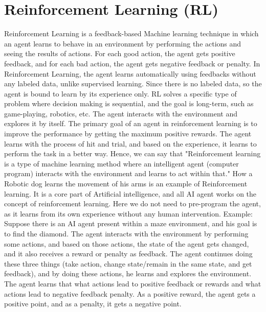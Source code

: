 \documentclass[12pt,a4paper]{report}
\begin{document}
\chapter{Reinforcement Learning (RL)}
\vspace{-1cm}
Reinforcement Learning is a feedback-based Machine learning technique in which an agent learns to behave in an environment by performing the actions and seeing the results of actions. For each good action, the agent gets positive feedback, and for each bad action, the agent gets negative feedback or penalty.
In Reinforcement Learning, the agent learns automatically using feedbacks without any labeled data, unlike supervised learning.
Since there is no labeled data, so the agent is bound to learn by its experience only.
RL solves a specific type of problem where decision making is sequential, and the goal is long-term, such as game-playing, robotics, etc.
The agent interacts with the environment and explores it by itself. The primary goal of an agent in reinforcement learning is to improve the performance by getting the maximum positive rewards.
The agent learns with the process of hit and trial, and based on the experience, it learns to perform the task in a better way. Hence, we can say that "Reinforcement learning is a type of machine learning method where an intelligent agent (computer program) interacts with the environment and learns to act within that." How a Robotic dog learns the movement of his arms is an example of Reinforcement learning.
It is a core part of Artificial intelligence, and all AI agent works on the concept of reinforcement learning. Here we do not need to pre-program the agent, as it learns from its own experience without any human intervention.
Example: Suppose there is an AI agent present within a maze environment, and his goal is to find the diamond. The agent interacts with the environment by performing some actions, and based on those actions, the state of the agent gets changed, and it also receives a reward or penalty as feedback.
The agent continues doing these three things (take action, change state/remain in the same state, and get feedback), and by doing these actions, he learns and explores the environment.
The agent learns that what actions lead to positive feedback or rewards and what actions lead to negative feedback penalty. As a positive reward, the agent gets a positive point, and as a penalty, it gets a negative point. \cite{javatpoint_rl}
\end{document}

